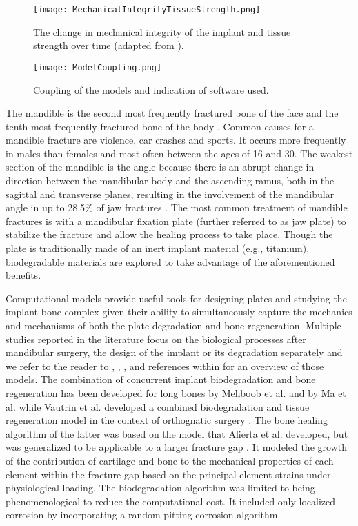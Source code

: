 \begin{figure}[ht]
    \centering
    \medskip
    \texttt{[image: MechanicalIntegrityTissueStrength.png]}
    \caption[The change in mechanical integrity of the implant and tissue strength over time]{The change in mechanical integrity of the implant and tissue strength over time (adapted from \cite{KChen}).}
    \label{fig:rateofdeg}
\end{figure}

\begin{figure}[ht]
    \centering
    \medskip
    \texttt{[image: ModelCoupling.png]}
    \caption{Coupling of the models and indication of software used.}
    \label{fig:ModelCoupling}
\end{figure}

The mandible is the second most frequently fractured bone of the face and the tenth most frequently fractured bone of the body \cite{Bhavik}. Common causes for a mandible fracture are violence, car crashes and sports. It occurs more frequently in males than females and most often between the ages of 16 and 30. The weakest section of the mandible is the angle because there is an abrupt change in direction between the mandibular body and the ascending ramus, both in the sagittal and transverse planes, resulting in the involvement of the mandibular angle in up to 28.5\% of jaw fractures \cite{Levy}. The most common treatment of mandible fractures is with a mandibular fixation plate (further referred to as jaw plate) to stabilize the fracture and allow the healing process to take place. Though the plate is traditionally made of an inert implant material (e.g., titanium), biodegradable materials are explored to take advantage of the aforementioned benefits.

Computational models provide useful tools for designing plates and studying the implant-bone complex given their ability to simultaneously capture the mechanics and mechanisms of both the plate degradation and bone regeneration. Multiple studies reported in the literature focus on the biological processes after mandibular surgery, the design of the implant or its degradation separately and we refer to the reader to \cite{Vautrin2021}, \cite{Zheng2019}, \cite{Wu2020}, \cite{Boccaccio2008} and references within for an overview of those models. The combination of concurrent implant biodegradation and bone regeneration has been developed for long bones by Mehboob et al. \cite{Mehboob2015} and by Ma et al. \cite{Ma2018} while Vautrin et al. developed a combined biodegradation and tissue regeneration model in the context of orthognatic surgery \cite{Vautrin2021}. The bone healing algorithm of the latter was based on the model that Alierta et al. developed, but was generalized to be applicable to a larger fracture gap \cite{Alierta2013}. It modeled the growth of the contribution of cartilage and bone to the mechanical properties of each element within the fracture gap based on the principal element strains under physiological loading. The biodegradation algorithm was limited to being phenomenological to reduce the computational cost. It included only localized corrosion by incorporating a random pitting corrosion algorithm.

